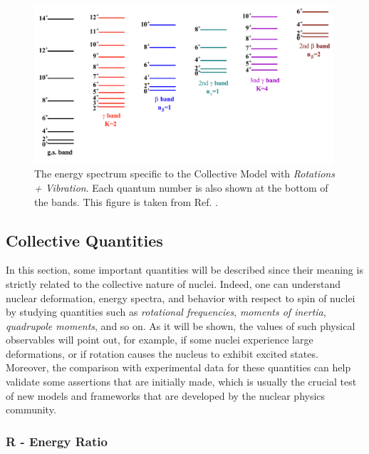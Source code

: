 \begin{figure}
    \centering
    \includegraphics[width=0.99\textwidth]{Chapters/Figures/types_collective_bands.pdf}
    \caption{The energy spectrum specific to the Collective Model with \emph{Rotations + Vibration}. Each quantum number is also shown at the bottom of the bands. This figure is taken from Ref. \cite{li2022model}.}
    \label{collective-rotation-vibration-energy-levels}
\end{figure}

\subsection{Collective Quantities}

In this section, some important quantities will be described since their meaning is strictly related to the collective nature of nuclei. Indeed, one can understand nuclear deformation, energy spectra, and behavior with respect to spin of nuclei by studying quantities such as \emph{rotational frequencies}, \emph{moments of inertia}, \emph{quadrupole moments}, and so on. As it will be shown, the values of such physical observables will point out, for example, if some nuclei experience large deformations, or if rotation causes the nucleus to exhibit excited states. Moreover, the comparison with experimental data for these quantities can help validate some assertions that are initially made, which is usually the crucial test of new models and frameworks that are developed by the nuclear physics community.

\subsubsection*{R - Energy Ratio}


